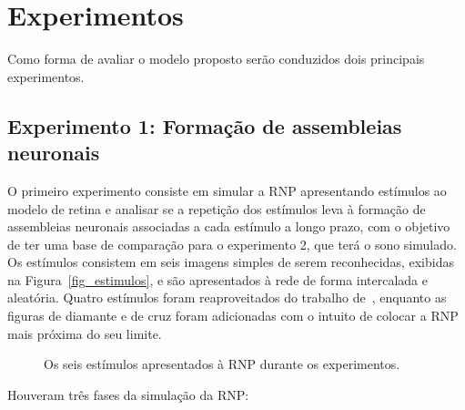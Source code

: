\section{Experimentos}\label{section_experimento}

Como forma de avaliar o modelo proposto serão conduzidos dois principais experimentos.

\subsection{Experimento 1: Formação de assembleias neuronais}

O primeiro experimento consiste em simular a RNP apresentando estímulos ao modelo de retina e analisar se a repetição dos
estímulos leva à formação de assembleias neuronais associadas a cada estímulo a longo prazo, com o objetivo de ter uma base de
comparação para o experimento 2, que terá o sono simulado. Os estímulos consistem em seis imagens simples de serem reconhecidas,
exibidas na Figura~\ref{fig_estimulos}, e são apresentados à rede de forma intercalada e aleatória. Quatro estímulos foram
reaproveitados do trabalho de~, enquanto as figuras de diamante e de cruz foram adicionadas com o
intuito de colocar a RNP mais próxima do seu limite.

\begin{figure}[!ht]
\caption{Os seis estímulos apresentados à RNP durante os experimentos.}
\end{figure}

Houveram três fases da simulação da RNP:

